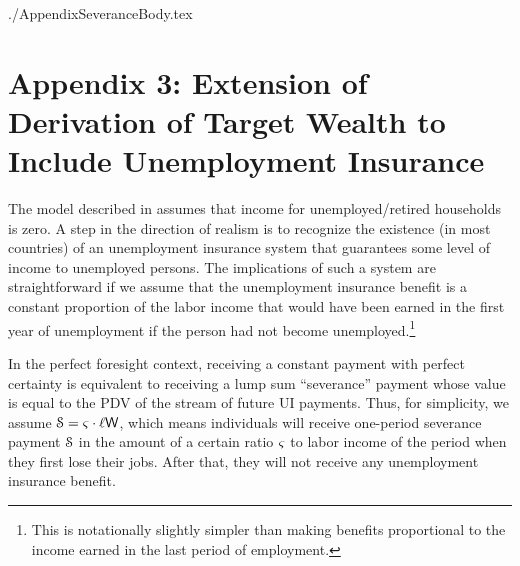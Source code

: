 \documentclass{econtex}
\begin{document}
\begin{verbatimwrite}{./AppendixSeveranceBody.tex}


\section*{Appendix 3: Extension of Derivation of Target Wealth to Include Unemployment Insurance}

The model described in \cite{ctDiscrete} assumes that income for
unemployed/retired households is zero.  A step in the direction of
realism is to recognize the existence (in most countries) of an
unemployment insurance system that guarantees some level of income to
unemployed persons.  The implications of such a system are
straightforward if we assume that the unemployment insurance benefit
is a constant proportion of the labor income that would have been
earned in the first year of unemployment if the person had not become
unemployed.\footnote{This is notationally slightly simpler than making
  benefits proportional to the income earned in the last period of
  employment.}

In the perfect foresight context, receiving a constant payment with
perfect certainty is equivalent to receiving a lump sum ``severance''
payment whose value is equal to the PDV of the stream of future UI
payments.  Thus, for simplicity, we assume
$\mathcal{S}=\varsigma\cdot\ell\mathsf{W}$, which means
individuals will receive one-period severance payment $\mathcal{S}$ in the amount of
a certain ratio $\varsigma$ to labor income of the period when they first lose their jobs. After that, they will not receive any unemployment
insurance benefit.


\end{verbatimwrite}
\end{document}
